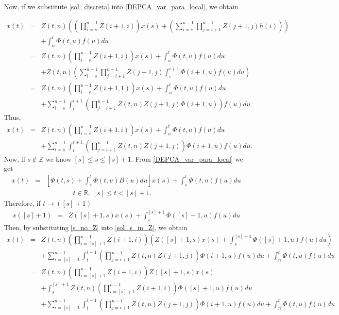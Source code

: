 \documentclass[english,,reqno]{amsart}
\numberwithin{equation}{section}
\newcommand{\bb}[1]{\mathbb{#1}}
\theoremstyle{plain}
\theoremstyle{definition}
\theoremstyle{remark}
\begin{document}
Now, if we substitute \eqref{sol_discreta} into \eqref{DEPCA_var_para_local}, we obtain

\begin{eqnarray*}
x(t) & = & Z(t,n)\left(\left(\prod_{i=s}^{n-1}Z(i+1,i)\right)x(s)
+\left(\sum_{i=s}^{n-1}\prod_{j=i+1}^{n-1}Z(j+1,j)h(i)\right)\right)\\
& &+\int_{n}^{t}\Phi(t,u)f(u)du\\
 & = & Z(t,n)\left(\prod_{i=s}^{n-1}Z(i+1,i)\right)x(s)+\int_{n}^{t}\Phi(t,u)f(u)du \\
 &  & +Z(t,n)\left(\sum_{i=s}^{n-1}\prod_{j=i+1}^{n-1}Z(j+1,j)\int_{i}^{i+1}\Phi(i+1,u)f(u)du\right)\\
 & = & Z(t,n)\left(\prod_{i=s}^{n-1}Z(i+1,1)\right)x(s)   +\int_{n}^{t}\Phi(t,u)f(u)du\\
 &  & +\sum_{i=s}^{n-1}\int_{i}^{i+1}\left(\prod_{j=i+1}^{n-1}Z(t,n)Z(j+1,j)\Phi(i+1,u)\right)f(u)du
\end{eqnarray*}
Thus,
\begin{eqnarray}
x(t) & = & Z(t,n)\left(\prod_{i=s}^{n-1}Z(i+1,i)\right)x(s)+\int_{n}^{t}\Phi(t,u)f(u)du \nonumber \\
 &  & +\sum_{i=s}^{n-1}\int_{i}^{i+1}\left(\prod_{j=i+1}^{n-1}Z(t,n)Z(j+1,j)\right)\Phi(i+1,u)f(u)du
 . \label{sol_s_in_Z}
\end{eqnarray}
Now, if $s\notin \bb{Z}$ we know $[s]\leq s\leq [s]+1$.  From \eqref{DEPCA_var_para_local} we get
\begin{eqnarray*}
x(t)&=& \left[\Phi(t,s)+\int_{s}^{t}\Phi(t,u)B(u)du\right]x(s)+\int_{s}^{t}\Phi(t,u)f(u)du\\
& & \ \ \ \ \ \ \ \ \ \ \ \ \ \ \ \ \ \ t\in \mathbb{R},\  [s]\leq t< [s]+1. \nonumber
\end{eqnarray*}
Therefore, if $t\rightarrow ([s]+1)$
\begin{eqnarray}
x([s]+1)&=& Z([s]+1,s)x(s)+\int_{s}^{[s]+1}\Phi([s]+1,u)f(u)du \label{s_no_Z}
\end{eqnarray}
Then, by substituting \eqref{s_no_Z} into \eqref{sol_s_in_Z}, we obtain 
\begin{eqnarray*}
x(t) & = & Z(t,n)\left(\prod_{i=[s]+1}^{n-1}Z(i+1,i)\right)\left( Z([s]+1,s)x(s)+\int_{s}^{[s]+1}\Phi([s]+1,u)f(u)du\right)\\
 &  & +\sum_{i=[s]+1}^{n-1}\int_{i}^{i+1}\left(\prod_{j=i+1}^{n-1}Z(t,n)Z(j+1,j)\right)\Phi(i+1,u)f(u)du
 +\int_{n}^{t}\Phi(t,u)f(u)du\\
 &=&Z(t,n)\left(\prod_{i=[s]+1}^{n-1}Z(i+1,i)\right)Z([s]+1,s)x(s)\\
 &&+\int_{s}^{[s]+1}Z(t,n)\left(\prod_{i=[s]+1}^{n-1}Z(i+1,i)\right)\Phi([s]+1,u)f(u)du\\
 &&+\sum_{i=[s]+1}^{n-1}\int_{i}^{i+1}\left(\prod_{j=i+1}^{n-1}Z(t,n)Z(j+1,j)\right)\Phi(i+1,u)f(u)du
 +\int_{n}^{t}\Phi(t,u)f(u)du
\end{eqnarray*}
\end{document}
